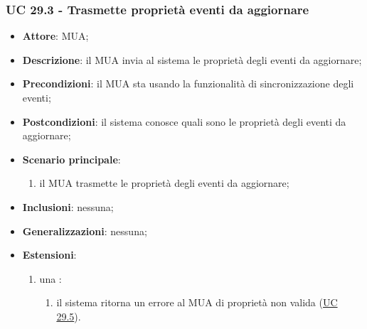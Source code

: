     \subsubsection{UC 29.3 - Trasmette proprietà eventi da aggiornare} \label{sec:UC29.3}
    \begin{itemize}
        \item \textbf{Attore}: MUA;
        \item \textbf{Descrizione}: il MUA invia al sistema le proprietà degli eventi da aggiornare;
        \item \textbf{Precondizioni}: il MUA sta usando la funzionalità di sincronizzazione degli eventi;
        \item \textbf{Postcondizioni}: il sistema conosce quali sono le proprietà degli eventi da aggiornare;
        \item \textbf{Scenario principale}:
            \begin{enumerate}
                \item il MUA trasmette le proprietà degli eventi da aggiornare;
            \end{enumerate}
        \item \textbf{Inclusioni}: nessuna;
        \item \textbf{Generalizzazioni}: nessuna;
        \item \textbf{Estensioni}:
            \begin{enumerate}[label=\alph*.]
                \item una :
                \begin{enumerate}[label=\arabic*.]
                    \item il sistema ritorna un errore al MUA di proprietà non valida (\hyperref[sec:UC29.5]{UC 29.5}).
                \end{enumerate}
            \end{enumerate}
    \end{itemize}


